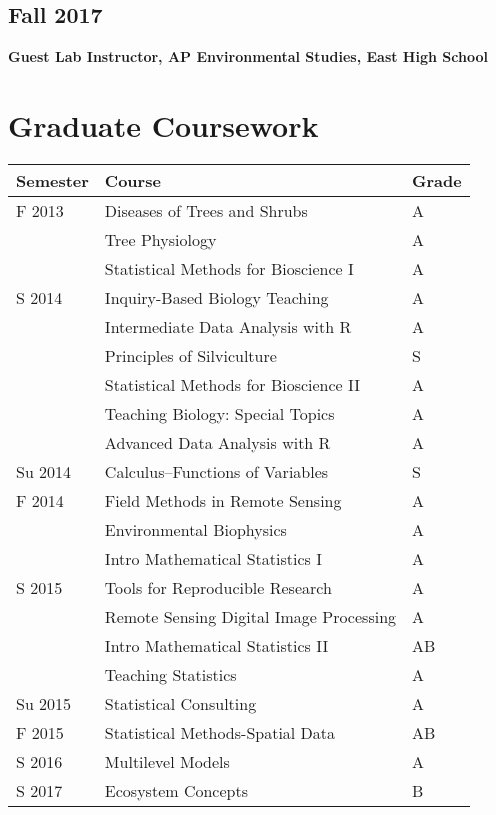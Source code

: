 \documentclass[11pt, sans]{moderncv}
\begin{document}
\subsection*{Fall 2017}
\label{sec:orga41e5e3}
\textbf{Guest Lab Instructor, AP Environmental Studies, East High School}


\section*{Graduate Coursework}
\label{sec:orgf81e735}
\begin{center}
\begin{tabular}{lll}
Semester & Course & Grade\\
\hline
F 2013 & Diseases of Trees and Shrubs & A\\
 & Tree Physiology & A\\
 & Statistical Methods for Bioscience I & A\\
S 2014 & Inquiry-Based Biology Teaching & A\\
 & Intermediate Data Analysis with R & A\\
 & Principles of Silviculture & S\\
 & Statistical Methods for Bioscience II & A\\
 & Teaching Biology: Special Topics & A\\
 & Advanced Data Analysis with R & A\\
Su 2014 & Calculus--Functions of Variables & S\\
F 2014 & Field Methods in Remote Sensing & A\\
 & Environmental Biophysics & A\\
 & Intro Mathematical Statistics I & A\\
S 2015 & Tools for Reproducible Research & A\\
 & Remote Sensing Digital Image Processing & A\\
 & Intro Mathematical Statistics II & AB\\
 & Teaching Statistics & A\\
Su 2015 & Statistical Consulting & A\\
F 2015 & Statistical Methods-Spatial Data & AB\\
S 2016 & Multilevel Models & A\\
S 2017 & Ecosystem Concepts & B\\
\end{tabular}
\end{center}
\end{document}
